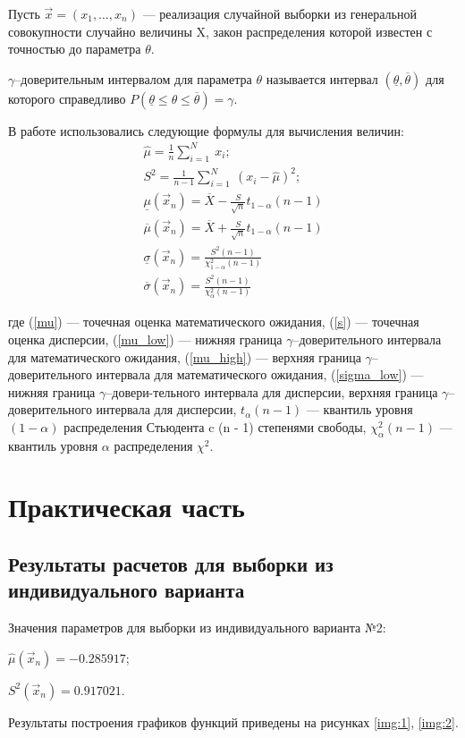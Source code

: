 \documentclass[a4paper, 14pt, unknownkeysallowed]{extreport}
\begin{document}
Пусть $\vec{x} = (x_1, \dots, x_n)$ --- реализация случайной выборки из генеральной совокупности случайно величины X, закон распределения которой известен с точностью до параметра $\theta$.

$\gamma$--доверительным интервалом для параметра $\theta$ называется интервал $(\underline{\theta}, \overline{\theta})$ для которого справедливо $P(\underline{\theta} \leq \theta \leq \overline{\theta}) = \gamma$.

В работе использовались следующие формулы для вычисления величин:
\begin{gather}
	\label{mu}
	\hat\mu = \frac{1}{n}\sum_{i = 1}^{N}~x_i;\\
	\label{s}
	S^2 = \frac{1}{n - 1}\sum_{i = 1}^{N}~(x_i - \hat\mu)^2;\\
	\label{mu_low}
	\underline{\mu}(\vec{x}_n) = \overline{X} - \frac{S}{\sqrt{n}}t_{1-\alpha}(n-1)\\
	\label{mu_high}
	\overline{\mu}(\vec{x}_n) = \overline{X} + \frac{S}{\sqrt{n}}t_{1-\alpha}(n-1)\\
	\label{sigma_low}
	\underline{\sigma}(\vec{x}_n) = \frac{S^2(n-1)}{\chi^2_{1-\alpha}(n-1)}\\
	\label{sigma_high}
	\overline{\sigma}(\vec{x}_n) = \frac{S^2(n-1)}{\chi^2_\alpha(n-1)}
\end{gather}

где (\ref{mu}) --- точечная оценка математического ожидания, (\ref{s}) --- точечная оценка дисперсии, (\ref{mu_low}) --- нижняя граница $\gamma$--доверительного интервала для математического ожидания, (\ref{mu_high}) --- верхняя граница $\gamma$--доверительного интервала для математического ожидания, (\ref{sigma_low}) --- нижняя граница $\gamma$--довери-тельного интервала для дисперсии, верхняя граница $\gamma$--доверительного интервала для дисперсии, $t_{\alpha}(n-1)$ --- квантиль уровня $(1 - \alpha)$ распределения Стьюдента c (n - 1) степенями свободы, $\chi^2_{\alpha}(n-1)$ --- квантиль уровня $\alpha$ распределения $\chi^2$.

\chapter{Практическая часть}
\section{Результаты расчетов для выборки из индивидуального варианта}

Значения параметров для выборки из индивидуального варианта №2:

$\hat{\mu}(\overrightarrow{x}_n)= -0.285917$;

$S^2(\overrightarrow{x}_n)= 0.917021$.

Результаты построения графиков функций приведены на рисунках \ref{img:1}, \ref{img:2}.

\end{document}
